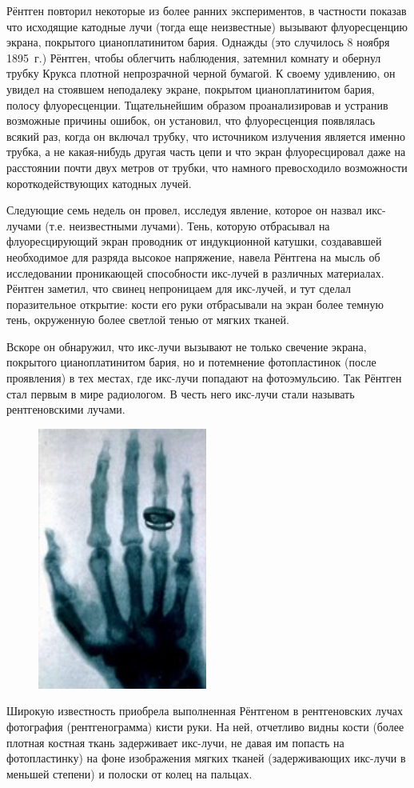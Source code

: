\documentclass[a4paper,14pt, openany, twoside, draft]{extbook} %
\begin{document}
Рёнтген повторил некоторые из более ранних экспериментов, в частности показав что исходящие катодные лучи (тогда еще неизвестные) вызывают флуоресценцию экрана, покрытого цианоплатинитом бария. Однажды (это случилось 8 ноября 1895~г.) Рёнтген, чтобы облегчить наблюдения, затемнил комнату и обернул трубку Крукса плотной непрозрачной черной бумагой. К своему удивлению, он увидел на стоявшем неподалеку экране, покрытом цианоплатинитом бария, полосу флуоресценции. Тщательнейшим образом проанализировав и устранив возможные причины ошибок, он установил, что флуоресценция появлялась всякий раз, когда он включал трубку, что источником излучения является именно трубка, а не какая-нибудь другая часть цепи и что экран флуоресцировал даже на расстоянии почти двух метров от трубки, что намного превосходило возможности короткодействующих катодных лучей.

Следующие семь недель он провел, исследуя явление, которое он назвал икс-лучами (т.е. неизвестными лучами). Тень, которую отбрасывал на флуоресцирующий экран проводник от индукционной катушки, создававшей необходимое для разряда высокое напряжение, навела Рёнтгена на мысль об исследовании проникающей способности икс-лучей в различных материалах. Рёнтген заметил, что свинец непроницаем для икс-лучей, и тут сделал поразительное открытие: кости его руки отбрасывали на экран более темную тень, окруженную более светлой тенью от мягких тканей.

Вскоре он обнаружил, что икс-лучи вызывают не только свечение экрана, покрытого цианоплатинитом бария, но и потемнение фотопластинок (после проявления) в тех местах, где икс-лучи попадают на фотоэмульсию. Так Рёнтген стал первым в мире радиологом. В честь него икс-лучи стали называть рентгеновскими лучами.

\begin{figure}
\centering
\includegraphics[width=5.546cm,height=8.599cm]{a11-img002.jpg}
\end{figure}
Широкую известность приобрела выполненная Рёнтгеном в рентгеновских лучах фотография (рентгенограмма) кисти руки. На ней, отчетливо видны кости (более плотная костная ткань задерживает икс-лучи, не давая им попасть на фотопластинку) на фоне изображения мягких тканей (задерживающих икс-лучи в меньшей степени) и полоски от колец на пальцах.
\end{document}
